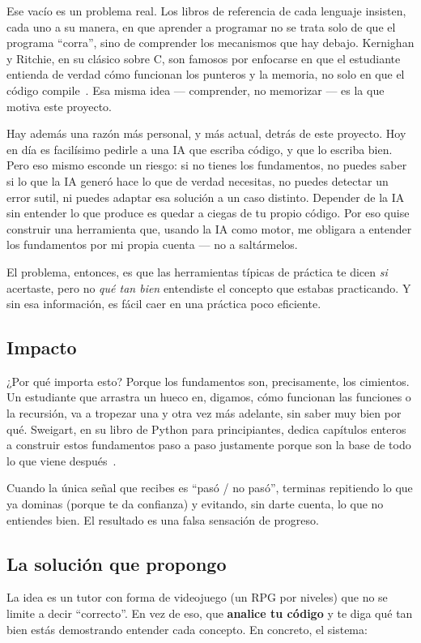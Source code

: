 \documentclass[11pt,letterpaper]{article}
\begin{document}
Ese vacío es un problema real. Los libros de referencia de cada
lenguaje insisten, cada uno a su manera, en que aprender a programar
no se trata solo de que el programa ``corra'', sino de comprender los
mecanismos que hay debajo. Kernighan y Ritchie, en su clásico sobre C,
son famosos por enfocarse en que el estudiante entienda de verdad cómo
funcionan los punteros y la memoria, no solo en que el código
compile~\cite{kr}. Esa misma idea --- comprender, no memorizar --- es
la que motiva este proyecto.

Hay además una razón más personal, y más actual, detrás de este
proyecto. Hoy en día es facilísimo pedirle a una IA que escriba
código, y que lo escriba bien. Pero eso mismo esconde un riesgo: si no
tienes los fundamentos, no puedes saber si lo que la IA generó hace lo
que de verdad necesitas, no puedes detectar un error sutil, ni puedes
adaptar esa solución a un caso distinto. Depender de la IA sin
entender lo que produce es quedar a ciegas de tu propio código. Por
eso quise construir una herramienta que, usando la IA como motor, me
obligara a entender los fundamentos por mi propia cuenta --- no a
saltármelos.

El problema, entonces, es que las herramientas típicas de práctica te
dicen \textit{si} acertaste, pero no \textit{qué tan bien} entendiste
el concepto que estabas practicando. Y sin esa información, es fácil
caer en una práctica poco eficiente.

\subsection{Impacto}
¿Por qué importa esto? Porque los fundamentos son, precisamente, los
cimientos. Un estudiante que arrastra un hueco en, digamos, cómo
funcionan las funciones o la recursión, va a tropezar una y otra vez
más adelante, sin saber muy bien por qué. Sweigart, en su libro de
Python para principiantes, dedica capítulos enteros a construir estos
fundamentos paso a paso justamente porque son la base de todo lo que
viene después~\cite{sweigart}.

Cuando la única señal que recibes es ``pasó / no pasó'', terminas
repitiendo lo que ya dominas (porque te da confianza) y evitando, sin
darte cuenta, lo que no entiendes bien. El resultado es una falsa
sensación de progreso.

\subsection{La solución que propongo}
La idea es un tutor con forma de videojuego (un RPG por niveles) que no
se limite a decir ``correcto''. En vez de eso, que \textbf{analice tu
código} y te diga qué tan bien estás demostrando entender cada
concepto. En concreto, el sistema:
\end{document}
